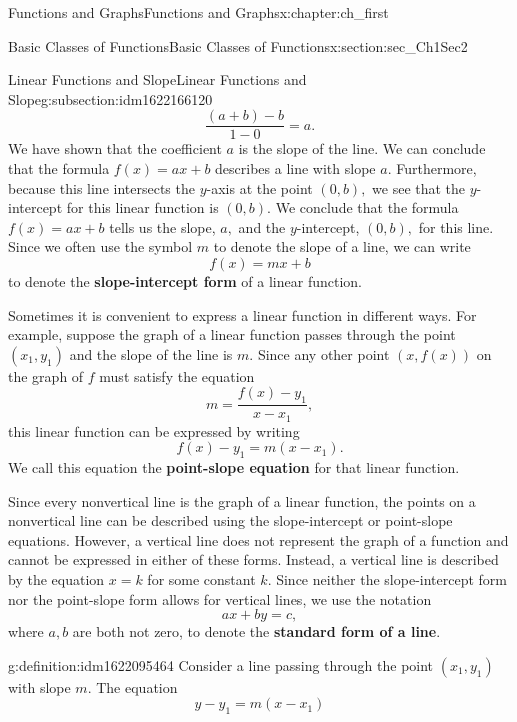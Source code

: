 \documentclass[oneside,10pt,]{book}
\newcommand{\terminology}[1]{\textbf{#1}}
\numberwithin{equation}{section}
\begin{document}
\begin{chapterptx}{Functions and Graphs}{}{Functions and Graphs}{}{}{x:chapter:ch_first}
\begin{sectionptx}{Basic Classes of Functions}{}{Basic Classes of Functions}{}{}{x:section:sec_Ch1Sec2}
\begin{subsectionptx}{Linear Functions and Slope}{}{Linear Functions and Slope}{}{}{g:subsection:idm1622166120}
%
\begin{equation*}
\frac{(a+b)-b}{1 - 0}=a.
\end{equation*}
We have shown that the coefficient \(a\) is the slope of the line. We can conclude that the formula \(f(x)=ax+b\) describes a line with slope \(a.\) Furthermore, because this line intersects the \(y\)-axis at the point \(( 0 ,b),\) we see that the \(y\)-intercept for this linear function is \(( 0 ,b).\) We conclude that the formula \(f(x)=ax+b\) tells us the slope, \(a,\) and the \(y\)-intercept, \(( 0 ,b),\) for this line. Since we often use the symbol \(m \) to denote the slope of a line, we can write%
%
\begin{equation*}
f(x)=mx+b
\end{equation*}
to denote the \terminology{slope-intercept form} of a linear function.%
\par
Sometimes it is convenient to express a linear function in different ways. For example, suppose the graph of a linear function passes through the point \((x_1,y_1)\) and the slope of the line is \(m.\) Since any other point \((x,f(x))\) on the graph of \(f\) must satisfy the equation%
%
\begin{equation*}
m= \frac{f(x)-y_1}{x-x_1},
\end{equation*}
this linear function can be expressed by writing%
%
\begin{equation*}
f(x)-y_1=m(x-x_1).
\end{equation*}
We call this equation the \terminology{point-slope equation} for that linear function.%
\par
Since every nonvertical line is the graph of a linear function, the points on a nonvertical line can be described using the slope-intercept or point-slope equations. However, a vertical line does not represent the graph of a function and cannot be expressed in either of these forms. Instead, a vertical line is described by the equation \(x=k\) for some constant \(k.\) Since neither the slope-intercept form nor the point-slope form allows for vertical lines, we use the notation%
%
\begin{equation*}
ax+by=c,
\end{equation*}
where \(a,b\) are both not zero, to denote the \terminology{standard form of a line}.%
\begin{definition}{}{g:definition:idm1622095464}%
Consider a line passing through the point \((x_1,y_1)\) with slope \(m.\) The equation%
%
\begin{equation*}
y-y_1=m(x-x_1)
\end{equation*}

\end{definition}
\end{subsectionptx}
\end{sectionptx}
\end{chapterptx}
\end{document}
